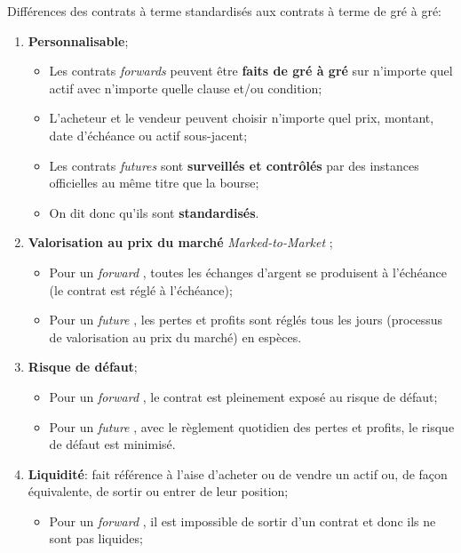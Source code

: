 \documentclass[10pt, french]{article}
\begin{document}
\begin{multicols*}{2}
\begin{definitionNOHFILL}
Différences des contrats à terme standardisés aux contrats à terme de gré à gré:
\begin{enumerate}[leftmargin = *]
	\item	\textbf{Personnalisable};
		\begin{itemize}[leftmargin = *]
		\item	Les contrats \og \textit{forwards} \fg{} peuvent être \textbf{faits de gré à gré} sur n'importe quel actif avec n'importe quelle clause et/ou condition;
		\item[]	L'acheteur et le vendeur peuvent choisir n'importe quel prix, montant, date d'échéance ou actif sous-jacent;	
		\item	Les contrats \og \textit{futures} \fg{} sont \textbf{surveillés et contrôlés} par des instances officielles au même titre que la bourse;
		\item[]	On dit donc qu'ils sont \textbf{standardisés}.
		\end{itemize}
	\item	\textbf{Valorisation au prix du marché} \og \textit{Marked-to-Market} \fg{};
		\begin{itemize}[leftmargin = *]
		\item	Pour un \og \textit{forward} \fg{}, toutes les échanges d'argent se produisent à l'échéance (le contrat est réglé à l'échéance);	
		\item	Pour un \og \textit{future} \fg{}, les pertes et profits sont réglés tous les jours (processus de valorisation au prix du marché) en espèces.
		\end{itemize}
	\item	\textbf{Risque de défaut};
		\begin{itemize}[leftmargin = *]
		\item	Pour un \og \textit{forward} \fg{}, le contrat est pleinement exposé au risque de défaut; 
		\item	Pour un \og \textit{future} \fg{}, avec le règlement quotidien des pertes et profits, le risque de défaut est minimisé.
		\end{itemize}
	\item	\textbf{Liquidité}: fait référence à l'aise d'acheter ou de vendre un actif ou, de façon équivalente, de sortir ou entrer de leur position;
		\begin{itemize}[leftmargin = *]
		\item	Pour un \og \textit{forward} \fg{}, il est impossible de sortir d'un contrat et donc ils ne sont pas liquides;

\end{itemize}
\end{enumerate}
\end{definitionNOHFILL}
\end{multicols*}
\end{document}
